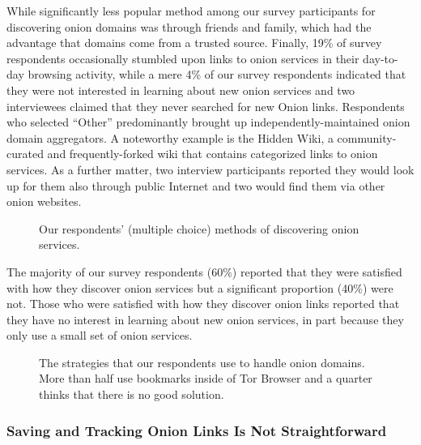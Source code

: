 While significantly less popular method among our survey participants for
discovering onion domains was through friends and family, which had the
advantage that domains come from a trusted source.  Finally, 19\%
of survey respondents occasionally stumbled upon links to onion services in
their day-to-day browsing activity, while a mere 4\% of our survey respondents
indicated that they were not interested in learning about new onion services and
two interviewees claimed that they never searched for new Onion links.
Respondents who selected ``Other'' predominantly brought up
independently-maintained onion domain aggregators.  A noteworthy example is the
Hidden Wiki, a community-curated and frequently-forked wiki that contains
categorized links to onion services.  As a further matter, two interview
participants reported they would look up for them also through public Internet
and two would find them via other onion websites.

\begin{figure}[t]
    \centering
    
    \caption{Our respondents' (multiple choice) methods of discovering onion
    services.}
    \label{fig:onion-discovery}
\end{figure}

The majority of our survey respondents (60\%) reported that they were satisfied
with how they discover onion services but a significant proportion (40\%) were
not. Those who were satisfied with how they discover onion links reported that
they have no interest in learning about new onion services, in part because they
only use a small set of onion services.

\begin{figure}[t]
    \centering
    
    \caption{The strategies that our respondents use to handle onion domains.
    More than half use bookmarks inside of Tor Browser and a quarter thinks that
    there is no good solution.}
    \label{fig:onion-domain-mgmt}
\end{figure}

\subsubsection{Saving and Tracking Onion Links Is Not Straightforward}

